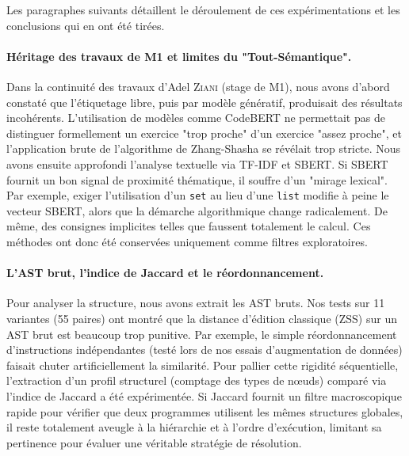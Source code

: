 Les paragraphes suivants détaillent le déroulement de ces expérimentations et les conclusions qui en ont été tirées.

\paragraph{Héritage des travaux de M1 et limites du "Tout-Sémantique".}
Dans la continuité des travaux d'Adel \textsc{Ziani} (stage de M1), nous avons d'abord constaté que l'étiquetage libre, puis par modèle génératif, produisait des résultats incohérents. L'utilisation de modèles comme CodeBERT ne permettait pas de distinguer formellement un exercice "trop proche" d'un exercice "assez proche", et l'application brute de l'algorithme de Zhang-Shasha se révélait trop stricte.
Nous avons ensuite approfondi l'analyse textuelle via TF-IDF et SBERT. Si SBERT fournit un bon signal de proximité thématique, il souffre d'un "mirage lexical". Par exemple, exiger l'utilisation d'un \texttt{set} au lieu d'une \texttt{list} modifie à peine le vecteur SBERT, alors que la démarche algorithmique change radicalement. De même, des consignes implicites telles que  faussent totalement le calcul. Ces méthodes ont donc été conservées uniquement comme filtres exploratoires.

\paragraph{L'AST brut, l'indice de Jaccard et le réordonnancement.}
Pour analyser la structure, nous avons extrait les AST bruts. Nos tests sur 11 variantes (55 paires) ont montré que la distance d'édition classique (ZSS) sur un AST brut est beaucoup trop punitive. Par exemple, le simple réordonnancement d'instructions indépendantes (testé lors de nos essais d'augmentation de données) faisait chuter artificiellement la similarité. 
Pour pallier cette rigidité séquentielle, l'extraction d'un profil structurel (comptage des types de nœuds) comparé via l'indice de Jaccard a été expérimentée. Si Jaccard fournit un filtre macroscopique rapide pour vérifier que deux programmes utilisent les mêmes structures globales, il reste totalement aveugle à la hiérarchie et à l'ordre d'exécution, limitant sa pertinence pour évaluer une véritable stratégie de résolution.

